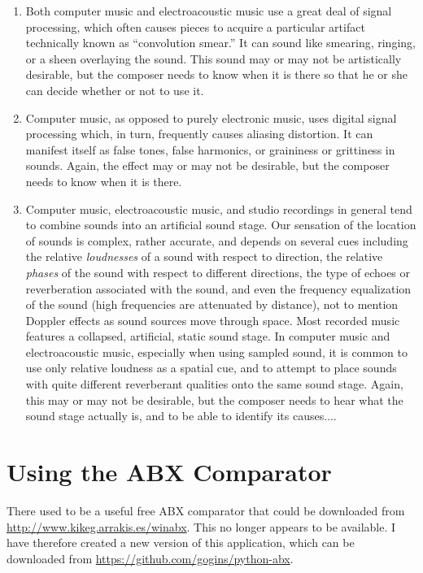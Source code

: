 \documentclass[english,11pt,letterpaper,onecolumn]{scrartcl}
\begin{document}
\begin{enumerate}
	\item Both computer music and electroacoustic music use a great deal of 
signal processing, which often causes pieces to acquire a particular artifact 
technically known as ``convolution smear.'' It can sound like smearing, 
ringing, or a sheen overlaying the sound. This sound may or may not be 
artistically desirable, but the composer needs to know when it is there so 
that he or she can decide whether or not to use it.
	
	\item Computer music, as opposed to purely electronic music, uses digital 
signal processing which, in turn, frequently causes aliasing distortion. It 
can manifest itself as false tones, false harmonics, or graininess or 
grittiness in sounds. Again, the effect may or may not be desirable, but the 
composer needs to know when it is there.

	\item Computer music, electroacoustic music, and studio recordings in 
general tend to combine sounds into an artificial sound stage. Our sensation 
of the location of sounds is complex, rather accurate, and depends on several 
cues including the relative \emph{loudnesses} of a sound with respect to 
direction, the relative \emph{phases} of the sound with respect to different 
directions, the type of echoes or reverberation associated with the sound, and 
even the frequency equalization of the sound (high frequencies are attenuated 
by distance), not to mention Doppler effects as sound sources move through 
space. Most recorded music features a collapsed, artificial, static sound stage. 
In computer music and electroacoustic music, especially when using sampled 
sound, it is common to use only relative loudness as a spatial cue, and to 
attempt to place sounds with quite different reverberant qualities onto the 
same sound stage. Again, this may or may not be desirable, but the composer 
needs to hear what the sound stage actually is, and to be able to identify its 
causes....
	
\end{enumerate}

\section{Using the ABX Comparator}
\label{sec:Using_the_ABX_Comparator}

There used to be a useful free ABX comparator that could be downloaded from  
\url{http://www.kikeg.arrakis.es/winabx}. This no longer appears to be 
available. I have therefore created a new version of this application,
which can be downloaded from \url{https://github.com/gogins/python-abx}.
\end{document}
